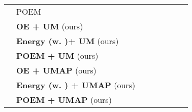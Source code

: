 \documentclass{article}
\theoremstyle{plain}
\theoremstyle{definition}
\theoremstyle{remark}
\begin{document}
\begin{table}[t!]
{\begin{tabular}{c|l|cccccc}
         & POEM &  &  &  &  &  & \\
         & \textbf{OE + UM} (ours) &  &  &  &  &  & \\
         & \textbf{Energy (w. )+ UM} (ours) &  &  &  &  &  & \\
         & \textbf{POEM + UM} (ours) &  &  &  &  &  & \\
         & \textbf{OE + UMAP} (ours) &  &  &  &  &  & \\
         & \textbf{Energy (w. ) + UMAP} (ours) &  &  &  &  &  & \\
         & \textbf{POEM + UMAP} (ours) &  &  &  &  &  & \\
        \bottomrule[1.5pt]
    \end{tabular}}
    \label{tab:my_label3}
\end{table}
\end{document}
